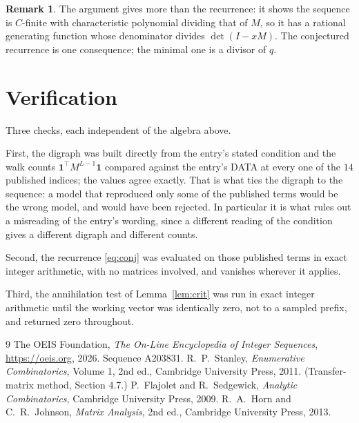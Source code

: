 \documentclass[11pt,a4paper]{article}
\theoremstyle{plain}
\theoremstyle{definition}
\newtheorem{remark}[theorem]{Remark}
\begin{document}
\begin{remark}
The argument gives more than the recurrence: it shows the sequence is $C$-finite with
characteristic polynomial dividing that of $M$, so it has a rational generating function
whose denominator divides $\det(I-xM)$. The conjectured recurrence is one consequence; the
minimal one is a divisor of $q$.
\end{remark}

\section{Verification}

Three checks, each independent of the algebra above.

First, the digraph was built directly from the entry's stated condition and the walk counts
$\mathbf{1}^{\!\top}M^{L-1}\mathbf{1}$ compared against the entry's DATA at
every one of the $14$ published indices; the values agree exactly. That is what ties
the digraph to the sequence: a model that reproduced only some of the published terms would
be the wrong model, and would have been rejected. In particular it is what rules out a
misreading of the entry's wording, since a different reading of the condition gives a
different digraph and different counts.

Second, the recurrence \eqref{eq:conj} was evaluated on those published terms in exact
integer arithmetic, with no matrices involved, and vanishes wherever it applies.

Third, the annihilation test of Lemma~\ref{lem:crit} was run in exact integer arithmetic
until the working vector was identically zero, not to a sampled prefix, and returned zero
throughout.

\begin{thebibliography}{9}
 The OEIS Foundation, \emph{The On-Line Encyclopedia of Integer
Sequences}, \url{https://oeis.org}, 2026. Sequence A203831.
 R.~P.~Stanley, \emph{Enumerative Combinatorics}, Volume 1, 2nd ed.,
Cambridge University Press, 2011. (Transfer-matrix method, Section 4.7.)
 P.~Flajolet and R.~Sedgewick, \emph{Analytic Combinatorics}, Cambridge
University Press, 2009.
 R.~A.~Horn and C.~R.~Johnson, \emph{Matrix Analysis}, 2nd ed., Cambridge
University Press, 2013.
\end{thebibliography}
\end{document}
